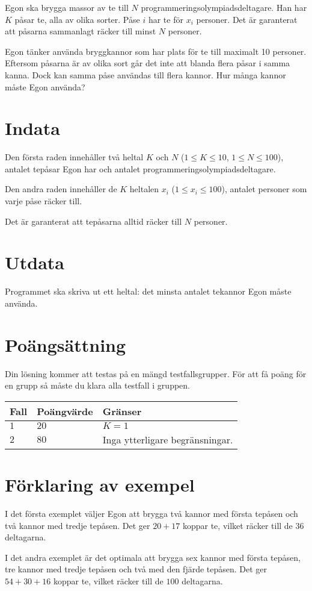 Egon ska brygga massor av te till $N$ programmeringsolympiadsdeltagare.
Han har $K$ påsar te, alla av olika sorter.
Påse $i$ har te för $x_i$ personer.
Det är garanterat att påsarna sammanlagt räcker till minst $N$ personer.

Egon tänker använda bryggkannor som har plats för te till maximalt 10 personer.
Eftersom påsarna är av olika sort
går det inte att blanda flera påsar i samma kanna.
Dock kan samma påse användas till flera kannor.
Hur många kannor måste Egon använda?

\section*{Indata}
Den första raden innehåller två heltal $K$ och $N$ ($1 \le K \le 10$, $1 \le N \le 100$), antalet tepåsar Egon har och antalet programmeringsolympiadsdeltagare. 

Den andra raden innehåller de $K$ heltalen $x_i$ ($1 \le x_i \le 100$), antalet personer som varje påse räcker till.

Det är garanterat att tepåsarna alltid räcker till $N$ personer.

\section*{Utdata}
Programmet ska skriva ut ett heltal: det minsta antalet tekannor Egon måste använda. 

\section*{Poängsättning}
Din lösning kommer att testas på en mängd testfallsgrupper.
För att få poäng för en grupp så måste du klara alla testfall i gruppen.

\noindent
\begin{tabular}{| l | l | l |}
  \hline
  Fall & Poängvärde & Gränser \\ \hline
  $1$    & $20$        &  $K = 1$\\ \hline 
  $2$    & $80$        &  Inga ytterligare begränsningar. \\ \hline
\end{tabular}


\section*{Förklaring av exempel}
I det första exemplet väljer Egon att brygga två kannor med första tepåsen och två kannor med tredje tepåsen.
Det ger $20+17$ koppar te, vilket
räcker till de $36$ deltagarna.

I det andra exemplet är det optimala att brygga sex kannor med första tepåsen,
tre kannor med tredje tepåsen och två med den fjärde tepåsen.
Det ger $54+30+16$ koppar te, vilket räcker till de $100$ deltagarna.
